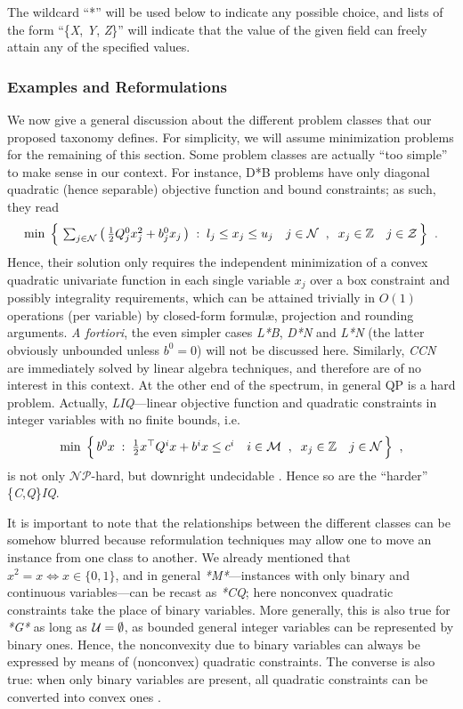 The wildcard ``*'' will be used below to indicate any possible choice, and lists of the form ``\{\textit{X}, \textit{Y}, \textit{Z}\}'' will indicate that the value of the given field can freely attain any of the specified values.



\subsubsection{Examples and Reformulations}\label{ssec:reform}

We now give a general discussion about the different problem classes that our proposed taxonomy defines.
For simplicity, we will assume minimization problems for the remaining of this section.
Some problem classes are actually ``too simple'' to make sense in our context. For instance, D*B problems have only diagonal quadratic (hence separable) objective function and bound constraints; as such, they read
\[
 \textstyle
 \min \; \Big\{ \,
 \sum_{j \in \mathcal{N}} \big( \, {\textstyle \frac{1}{2}} Q^0_j x_j^2 + b^0_j x_j \, \big) \;:\;
 l_j \leq x_j \leq u_j \quad j \in \mathcal{N} \;\;,\;\;
 x_j \in \mathbb{Z} \quad j \in \mathcal{Z} \, \Big\}
 \;\; .
\]
Hence, their solution only requires the independent minimization of a convex quadratic univariate function in each single variable $x_j$ over a box constraint and possibly integrality requirements, which can be attained trivially in $O(1)$ operations (per variable) by closed-form formul{\ae}, projection and rounding arguments. \emph{A fortiori}, the even simpler cases \textit{L*B}, \textit{D*N} and \textit{L*N} (the latter obviously unbounded unless $b^0 = 0$) will not be discussed here. Similarly, \textit{CCN} are immediately solved by linear algebra techniques, and therefore are of no interest in this context. At the other end of the spectrum, in general QP is a hard problem. Actually, \textit{LIQ}---linear objective function and quadratic constraints in integer variables with no finite bounds, i.e.
\[
 \textstyle
 \min \; \Big\{ \, b^0 x \;:\;
 {\textstyle \frac{1}{2}} x^\top Q^i x + b^i x \leq c^i \quad i \in \mathcal{M} \;\;,\;\;
 x_j \in \mathbb{Z} \quad j \in \mathcal{N} \, \Big\}
 \;\; ,
\]
is not only $\mathcal{NP}$-hard, but downright undecidable \cite{jeroslow}. Hence so are the ``harder'' \{\textit{C},\textit{Q}\}\textit{IQ}.

It is important to note that the relationships between the different classes can be somehow blurred because reformulation techniques may allow one to move an instance from one class to another. We already mentioned that $x^2 = x \iff x \in \{0, 1\}$, and in general \textit{*M*}---instances with only binary and continuous variables---can be recast as \textit{*CQ}; here nonconvex quadratic constraints take the place of binary variables. More generally, this is also true for \textit{*G*} as long as $\mathcal{U} = \emptyset$, as bounded general integer variables can be represented by binary ones.
Hence, the nonconvexity due to binary variables can always be expressed by means of (nonconvex) quadratic constraints. The converse is also true: when only binary variables are present, all quadratic constraints can be converted into convex ones \cite{BEP09,BEL13}.


